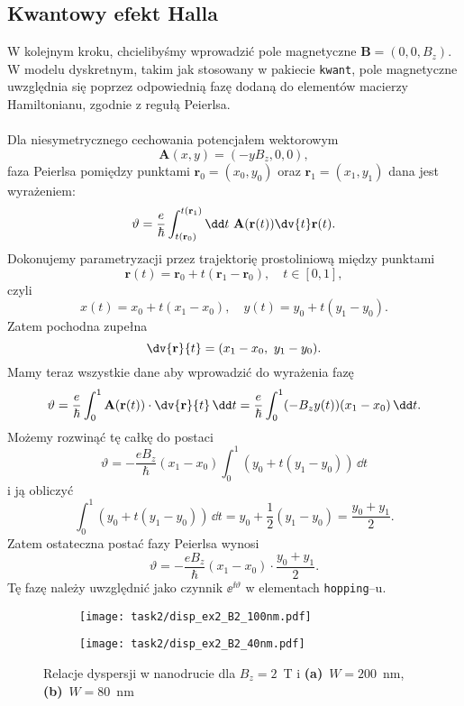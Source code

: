 \documentclass{article}
\begin{document}
 \subsection*{Kwantowy efekt Halla}
W kolejnym kroku, chcielibyśmy wprowadzić pole magnetyczne $\mathbf{B} = (0, 0, B_z)$.
W modelu dyskretnym, takim jak stosowany w pakiecie \texttt{kwant}, pole magnetyczne uwzględnia się poprzez odpowiednią fazę dodaną do elementów macierzy Hamiltonianu, zgodnie z regułą Peierlsa.\\
\\
Dla niesymetrycznego cechowania potencjałem wektorowym
\[
\mathbf{A}(x, y) = (-yB_z, 0, 0),
\]
faza Peierlsa pomiędzy punktami $\mathbf{r}_0 = (x_0, y_0)$ oraz $\mathbf{r}_1 = (x_1, y_1)$ dana jest wyrażeniem:
\[
\vartheta = \frac{e}{\hbar} \int_{t(\mathbf{r}_0)}^{t(\mathbf{r}_1)} \dd t\ \mathbf{A}(\mathbf{r}(t))\dv{t}\mathbf{r}(t).
\]
Dokonujemy parametryzacji przez trajektorię prostoliniową między punktami
\[
\mathbf{r}(t) = \mathbf{r}_0 + t(\mathbf{r}_1 - \mathbf{r}_0), \quad t \in [0, 1],
\]
czyli 
\[
x(t) = x_0 + t(x_1 - x_0), \quad y(t) = y_0 + t(y_1 - y_0).
\]
Zatem pochodna zupełna
\[
\dv{\mathbf{r}}{t} = (x_1 - x_0, \ y_1 - y_0).
\]
Mamy teraz wszystkie dane aby wprowadzić do wyrażenia fazę
\[
\vartheta = \frac{e}{\hbar} \int_0^1 \mathbf{A}(\mathbf{r}(t)) \cdot \dv{\mathbf{r}}{t} \, \dd t = \frac{e}{\hbar} \int_0^1 (-B_z y(t))(x_1 - x_0) \, \dd t.
\]
Możemy rozwinąć tę całkę do postaci
\[
\vartheta = -\frac{e B_z}{\hbar} (x_1 - x_0) \int_0^1 (y_0 + t(y_1 - y_0)) \, \dd t
\]
i ją obliczyć
\[
\int_0^1 (y_0 + t(y_1 - y_0)) \, \dd t = y_0 + \frac{1}{2}(y_1 - y_0) = \frac{y_0 + y_1}{2}.
\]
Zatem ostateczna postać fazy Peierlsa wynosi
\[
\vartheta = -\frac{e B_z}{\hbar} (x_1 - x_0) \cdot \frac{y_0 + y_1}{2}.
\]
Tę fazę należy uwzględnić jako czynnik $\ee^{\ii \vartheta}$ w elementach \texttt{hopping}--u.\\
\begin{figure}[htp!]
    \centering
\begin{subfigure}{.495\textwidth}
    \texttt{[image: task2/disp\_ex2\_B2\_100nm.pdf]}
    \caption{}
    \label{fig:task2-disp100nm}
\end{subfigure}
\begin{subfigure}{.495\textwidth}
    \texttt{[image: task2/disp\_ex2\_B2\_40nm.pdf]}
    \caption{}
    \label{fig:task2-disp140nm}
\end{subfigure}
\caption{Relacje dyspersji w nanodrucie dla $B_z=2$~T i \textbf{(a)}~$W=200$~nm, \textbf{(b)}~$W=80$~nm}
\label{fig:task2-dispersion}
\end{figure}
\end{document}
